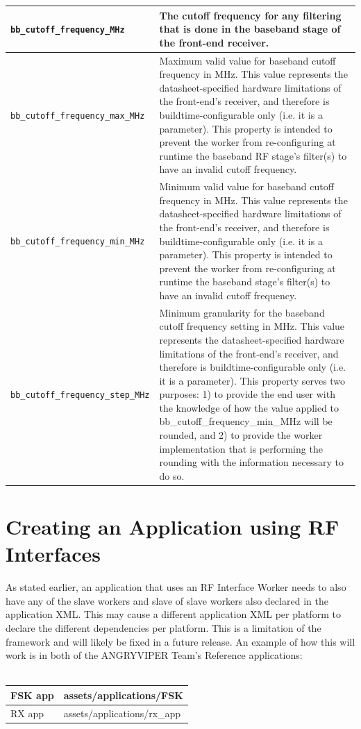 \begin{longtable}{|p{5cm}|p{12cm}|}
			\hline
			\verb+bb_cutoff_frequency_MHz+      & The cutoff frequency for any filtering that is done in the baseband stage of the front-end receiver. \\
			\hline
			\verb+bb_cutoff_frequency_max_MHz+  & Maximum valid value for baseband cutoff frequency in MHz. This value represents the datasheet-specified hardware limitations of the front-end's receiver, and therefore is buildtime-configurable only (i.e. it is a parameter). This property is intended to prevent the worker from re-configuring at runtime the baseband RF stage's filter(s) to have an invalid cutoff frequency. \\
			\hline
			\verb+bb_cutoff_frequency_min_MHz+  & Minimum valid value for baseband cutoff frequency in MHz. This value represents the datasheet-specified hardware limitations of the front-end's receiver, and therefore is buildtime-configurable only (i.e. it is a parameter). This property is intended to prevent the worker from re-configuring at runtime the baseband stage's filter(s) to have an invalid cutoff frequency. \\
			\hline
			\verb+bb_cutoff_frequency_step_MHz+ & Minimum granularity for the baseband cutoff frequency setting in MHz. This value represents the datasheet-specified hardware limitations of the front-end's receiver, and therefore is buildtime-configurable only (i.e. it is a parameter). This property serves two purposes: 1) to provide the end user with the knowledge of how the value applied to bb\_cutoff\_frequency\_min\_MHz will be rounded, and 2) to provide the worker implementation that is performing the rounding with the information necessary to do so. \\
			\hline
		\end{longtable}
\newpage
\section{Creating an Application using RF Interfaces}
As stated earlier, an application that uses an RF Interface Worker needs to also have any of the slave workers and slave of slave workers also declared in the application XML.  This may cause a different application XML per platform to declare the different dependencies per platform.  This is a limitation of the framework and will likely be fixed in a future release.  An example of how this will work is in both of the ANGRYVIPER Team's Reference applications: \\ \\
   \begin{tabular}{|p{2cm}|p{7cm}|}
      \hline
      FSK app & assets/applications/FSK \\
      \hline
      RX app & assets/applications/rx\_app  \\
      \hline
   \end{tabular}
   \\

